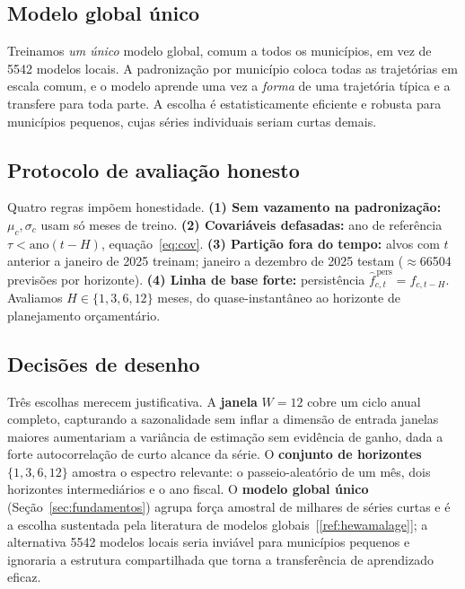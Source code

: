 \documentclass[12pt,a4paper,oneside]{article}
\newcommand{\C}[1]{[\ref{#1}]}
\begin{document}
\subsection{Modelo global único}

Treinamos \emph{um único} modelo global, comum a todos os municípios, em
vez de \num{5542} modelos locais. A padronização por município coloca
todas as trajetórias em escala comum, e o modelo aprende uma vez a
\emph{forma} de uma trajetória típica e a transfere para toda parte.
A escolha é estatisticamente eficiente e robusta para municípios pequenos,
cujas séries individuais seriam curtas demais.

\subsection{Protocolo de avaliação honesto}
\label{sec:protocolo}

Quatro regras impõem honestidade. \textbf{(1) Sem vazamento na
padronização:} $\mu_c,\sigma_c$ usam só meses de treino. \textbf{(2)
Covariáveis defasadas:} ano de referência $\tau<\text{ano}(t-H)$,
equação~\eqref{eq:cov}. \textbf{(3) Partição fora do tempo:} alvos com $t$
anterior a janeiro de 2025 treinam; janeiro a dezembro de 2025 testam
($\approx$\num{66504} previsões por horizonte). \textbf{(4) Linha de base
forte:} persistência $\widehat{f}^{\,\text{pers}}_{c,t}=f_{c,t-H}$.
Avaliamos $H\in\{1,3,6,12\}$ meses, do quase-instantâneo ao horizonte de
planejamento orçamentário.

\subsection{Decisões de desenho}

Três escolhas merecem justificativa. A \textbf{janela} $W=12$ cobre um
ciclo anual completo, capturando a sazonalidade sem inflar a dimensão de
entrada \textemdash{} janelas maiores aumentariam a variância de estimação
sem evidência de ganho, dada a forte autocorrelação de curto alcance da
série. O \textbf{conjunto de horizontes} $\{1,3,6,12\}$ amostra o espectro
relevante: o passeio-aleatório de um mês, dois horizontes intermediários e
o ano fiscal. O \textbf{modelo global único} (Seção~\ref{sec:fundamentos})
agrupa força amostral de milhares de séries curtas e é a escolha
sustentada pela literatura de modelos globais~\C{ref:hewamalage}; a
alternativa \textemdash{} \num{5542} modelos locais \textemdash{} seria
inviável para municípios pequenos e ignoraria a estrutura compartilhada que
torna a transferência de aprendizado eficaz.
\end{document}
